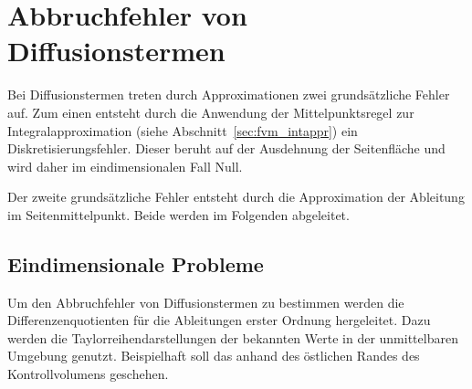 \section{Abbruchfehler von Diffusionstermen}
\label{sec:Diffusionsterme}

Bei Diffusionstermen treten durch Approximationen zwei grundsätzliche Fehler auf.
Zum einen entsteht durch die Anwendung der Mittelpunktsregel zur Integralapproximation
(siehe Abschnitt~\ref{sec:fvm_intappr}) ein Diskretisierungsfehler.
Dieser beruht auf der Ausdehnung der Seitenfläche und wird daher im eindimensionalen Fall
Null.

Der zweite grundsätzliche Fehler entsteht durch die Approximation der Ableitung im
Seitenmittelpunkt. Beide werden im Folgenden abgeleitet.
\subsection{Eindimensionale Probleme}
\label{sec:te_dif_1d}

Um den Abbruchfehler von Diffusionstermen zu bestimmen werden die Differenzenquotienten
für die Ableitungen erster Ordnung hergeleitet. Dazu werden die Taylorreihendarstellungen der bekannten
Werte in der unmittelbaren Umgebung genutzt. Beispielhaft soll das anhand des östlichen
Randes des Kontrollvolumens geschehen.


